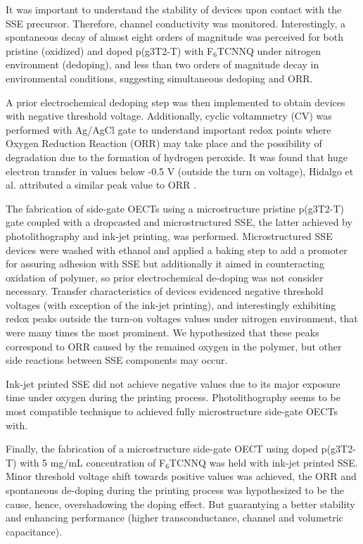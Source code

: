 It was important to understand the stability of devices upon contact with the SSE precursor. Therefore, channel conductivity was monitored. Interestingly, a spontaneous decay of almost eight orders of magnitude was perceived for both pristine (oxidized) and doped p(g3T2-T) with F$_{6}$TCNNQ under nitrogen environment (dedoping), and less than two orders of magnitude decay in environmental conditions, suggesting simultaneous dedoping and ORR. 

A prior electrochemical dedoping step was then implemented to obtain devices with negative threshold voltage. Additionally, cyclic voltammetry (CV) was performed with Ag/AgCl gate to understand important redox points where Oxygen Reduction Reaction (ORR) may take place and the possibility of degradation due to the formation of hydrogen peroxide. It was found that huge electron transfer in values below -0.5 V (outside the turn on voltage), Hidalgo et al. attributed a similar peak value to ORR \cite{hidalgocastilloSimultaneousPerformanceStability2022a}.

The fabrication of side-gate OECTs using a microstructure pristine p(g3T2-T) gate coupled with a dropcasted and microstructured SSE, the latter achieved by photolithography and ink-jet printing, was performed. Microstructured SSE devices were washed with ethanol and applied a baking step to add a promoter for assuring adhesion with SSE but additionally it aimed in counteracting oxidation of polymer, so prior electrochemical de-doping was not consider necessary. Transfer characteristics of devices evidenced negative threshold voltages (with exception of the ink-jet printing), and interestingly exhibiting redox peaks outside the turn-on voltages values under nitrogen environment, that were many times the most prominent. We hypothesized that these peaks correspond to ORR caused by the remained oxygen in the polymer, but other side reactions between SSE components may occur. 

Ink-jet printed SSE did not achieve negative values due to its major exposure time under oxygen during the printing process. Photolithography seems to be most compatible technique to achieved fully microstructure side-gate OECTs with.

Finally, the fabrication of a microstructure side-gate OECT using doped p(g3T2-T) with 5 mg/mL concentration of F$_{6}$TCNNQ was held with ink-jet printed SSE. Minor threshold voltage shift towards positive values was achieved, the ORR and spontaneous de-doping during the printing process was hypothesized to be the cause, hence, overshadowing the doping effect. But guarantying a better stability and enhancing performance (higher transconductance, channel and volumetric capacitance).


